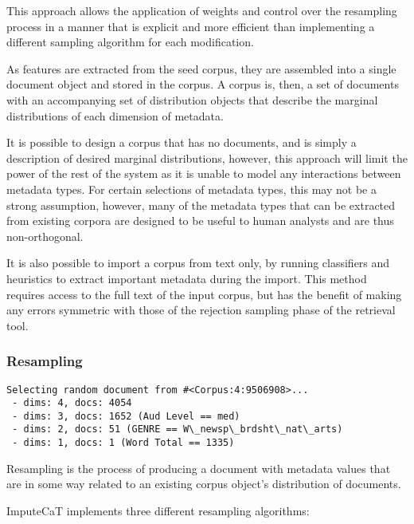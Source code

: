 This approach allows the application of weights and control over the resampling process in a manner that is explicit and more efficient than implementing a different sampling algorithm for each modification.

As features are extracted from the seed corpus, they are assembled into a single document object and stored in the corpus.  A corpus is, then, a set of documents with an accompanying set of distribution objects that describe the marginal distributions of each dimension of metadata.

It is possible to design a corpus that has no documents, and is simply a description of desired marginal distributions, however, this approach will limit the power of the rest of the system as it is unable to model any interactions between metadata types.  For certain selections of metadata types, this may not be a strong assumption, however, many of the metadata types that can be extracted from existing corpora are designed to be useful to human analysts and are thus non-orthogonal.

It is also possible to import a corpus from text only, by running classifiers and heuristics to extract important metadata during the import.  This method requires access to the full text of the input corpus, but has the benefit of making any errors symmetric with those of the rejection sampling phase of the retrieval tool.


\subsubsection{Resampling}
\label{sec:rebuilding:method:retrieval:resampling}

\begin{lstlisting}
Selecting random document from #<Corpus:4:9506908>...
 - dims: 4, docs: 4054
 - dims: 3, docs: 1652 (Aud Level == med)
 - dims: 2, docs: 51 (GENRE == W\_newsp\_brdsht\_nat\_arts)
 - dims: 1, docs: 1 (Word Total == 1335)
\end{lstlisting}

Resampling is the process of producing a document with metadata values that are in some way related to an existing corpus object's distribution of documents.

ImputeCaT implements three different resampling algorithms:

